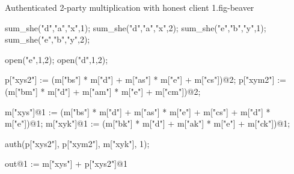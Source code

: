 \begin{fpfig}[t]{Authenticated 2-party multiplication with honest client 1.}{fig-beaver}
{\footnotesize
\begin{verbatimtab}
sum_she("d","a","x",1);
sum_she("d","a","x",2);
sum_she("e","b","y",1);
sum_she("e","b","y",2);

open("e",1,2);
open("d",1,2);

p["xys2"] := (m["bs"] * m["d"] + m["as"] * m["e"] + m["cs"])@2;
p["xym2"] := (m["bm"] * m["d"] + m["am"] * m["e"] + m["cm"])@2;

m["xys"]@1 := (m["bs"] * m["d"] + m["as"] * m["e"] + m["cs"] +
               m["d"] * m["e"])@1;
m["xyk"]@1 := (m["bk"] * m["d"] + m["ak"] * m["e"] + m["ck"])@1;

auth(p["xys2"], p["xym2"], m["xyk"], 1);

out@1 := m["xys"] + p["xys2"]@1
\end{verbatimtab}
}
\end{fpfig}

\begin{comment}

\begin{fpfig}[t]{Authenticated 2-Party Multiplication.}{fig-beaver}
{\footnotesize
  \begin{verbatimtab}
    secopen("a","x","d",1,2);
    secopen("a","x","d",2,1);
    secopen("b","y","e",1,2);
    secopen("b","y","e",2,1);
    let xys =
      macsum(macctimes(macshare("b"), m["d"]),
             macsum(macctimes(macshare("a"), m["e"]),
                    macshare("c")))
    in
    let xyk = mack("b") * m["d"] + mack("a") * m["d"] + mack("c")               
    in
    secreveal(xys,xyk,"1",1,2);
    secreveal(maccsum(xys,m["d"] * m["e"]),
              xyk - m["d"] * m["e"],
              "2",2,1);
    out@1 := (p[1] + p[2])@1;
    out@2 := (p[1] + p[2])@2;
  \end{verbatimtab}
}
\end{fpfig}

\end{comment}
